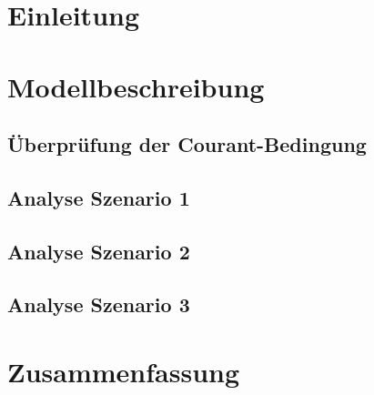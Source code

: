 \vspace*{-60pt}
\chapter{Einleitung}


\chapter{Modellbeschreibung}

\section{Überprüfung der Courant-Bedingung}

\section{Analyse Szenario 1}

\section{Analyse Szenario 2}

\section{Analyse Szenario 3}

\chapter{Zusammenfassung}












